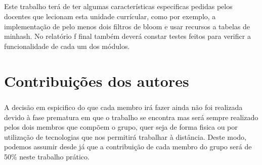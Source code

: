\documentclass{report}
\begin{document}
\paragraph{}
Este trabalho terá de ter algumas características especificas pedidas pelos docentes que lecionam esta unidade currícular, como por exemplo, a implementação de pelo menos dois filtros de bloom e usar recursos a tabelas de minhash. No relatório f final também deverá constar testes feitos para verificr a funcionalidade de cada um dos módulos.

\chapter{Contribuições dos autores}
\label{chap.Contribuições dos autores}
\paragraph{}
A decisão em espicifico do que cada membro irá fazer ainda não foi realizada devido à fase prematura em que o trabalho se encontra mas será sempre realizado pelos dois membros que compõem o grupo, quer seja de forma fisica ou por utilização de tecnologias que nos permitirá trabalhar à distância. Deste modo, podemos assumir desde já que a contribuição de cada membro do grupo será de 50\% neste trabalho prático.




\printbibliography
\end{document}

